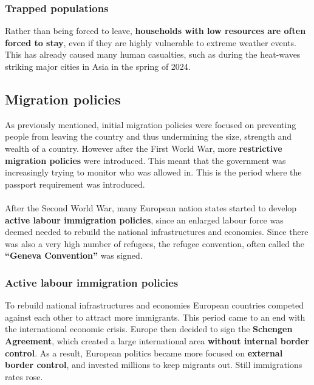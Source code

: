 \documentclass[../summary.tex]{subfiles}
\begin{document}
\subsubsection{Trapped populations}
Rather than being forced to leave, \textbf{households with low resources are often forced to stay}, even if they are highly vulnerable to extreme weather events. This has already caused many human casualties, such as during the heat-waves striking major cities in Asia in the spring of 2024.

\subsection{Migration policies}
As previously mentioned, initial migration policies were focused on preventing people from leaving the country and thus undermining the size, strength and wealth of a country. However after the First World War, more \textbf{restrictive migration policies} were introduced. This meant that the government was increasingly trying to monitor who was allowed in. This is the period where the passport requirement was introduced.
\\\\
After the Second World War, many European nation states started to develop \textbf{active labour immigration policies}, since an enlarged labour force was deemed needed to rebuild the national infrastructures and economies. Since there was also a very high number of refugees, the refugee convention, often called the \textbf{``Geneva Convention''} was signed.

\newpage

\subsubsection{Active labour immigration policies}
To rebuild national infrastructures and economies European countries competed against each other to attract more immigrants. This period came to an end with the international economic crisis. Europe then decided to sign the \textbf{Schengen Agreement}, which created a large international area \textbf{without internal border control}. As a result, European politics became more focused on \textbf{external border control}, and invested millions to keep migrants out. Still immigrations rates rose.
\end{document}

